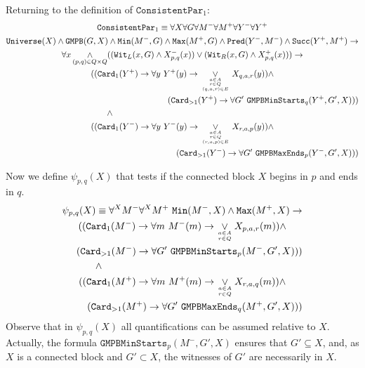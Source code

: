 \documentclass{CSML}
\begin{document}
Returning to the definition of $\texttt{ConsistentPar}_1$:
\begin{multline*}
  \texttt{ConsistentPar}_1\equiv\forall X\forall G\forall M^-\forall M^+\forall Y^-\forall Y^+\\
  \texttt{Universe}(X)\land\texttt{GMPB}(G,X)\land\texttt{Min}(M^-,G)\land\texttt{Max}(M^+,G)\land \texttt{Pred}(Y^-,M^-)\land \texttt{Succ}(Y^+,M^+)\rightarrow\\
  \forall x\mathop\land_{(p,q)\in Q\times Q}((\texttt{Wit}_L(x,G)\land X^-_{p,q}(x))\lor(\texttt{Wit}_R(x,G)\land X^+_{p,q}(x)))\rightarrow\\
  ( (\texttt{Card}_1(Y^+)\rightarrow \forall y\ Y^+(y)\rightarrow \mathop\lor_{a\in A\atop{r\in Q\atop (q,a,r)\in E}}X_{q,a,r}(y))\land\\
    \hfill(\texttt{Card}_{>1}(Y^+)\rightarrow \forall G'\ \texttt{GMPBMinStarts}_q(Y^+,G',X))  )\\
  \land\hskip6cm\\
  ( (\texttt{Card}_1(Y^-)\rightarrow \forall y\ Y^-(y)\rightarrow \mathop\lor_{a\in A\atop{r\in Q\atop (r,a,p)\in E}}X_{r,a,p}(y))\land\\
    \hfill(\texttt{Card}_{>1}(Y^-)\rightarrow \forall G'\ \texttt{GMPBMaxEnds}_p(Y^-,G',X))  )\\
\end{multline*}

\noindent Now we define $\psi_{p,q}(X)$ that tests if the connected block $X$ begins in $p$ and ends in $q$.
\begin{multline*}
  \psi_{p,q}(X)\equiv
  \forall^X M^-\forall^X M^+\ \texttt{Min}(M^-,X)\land \texttt{Max}(M^+,X) \rightarrow\\
  ( (\texttt{Card}_1(M^-)\rightarrow \forall m\ M^-(m)\rightarrow \mathop\lor_{a\in A\atop r\in Q} X_{p,a,r}(m))
    \land\\
    \hfill(\texttt{Card}_{>1}(M^-)\rightarrow \forall G'\ \texttt{GMPBMinStarts}_{p}(M^-,G',X)) )\\
  \land\hskip6cm\\
  ( (\texttt{Card}_1(M^+)\rightarrow \forall m\ M^+(m)\rightarrow \mathop\lor_{a\in A\atop r\in Q} X_{r,a,q}(m))
    \land\\
    \hfill(\texttt{Card}_{>1}(M^+)\rightarrow \forall G'\ \texttt{GMPBMaxEnds}_{q}(M^+,G',X)) )
\end{multline*}
Observe that in $\psi_{p,q}(X)$ all quantifications can be assumed relative to $X$. Actually, the formula $\texttt{GMPBMinStarts}_{p}(M^-,G',X)$ ensures that $G'\subseteq X$, and, as $X$ is a connected block and $G'\subset X$, the witnesses of $G'$ are necessarily in $X$.
\end{document}
